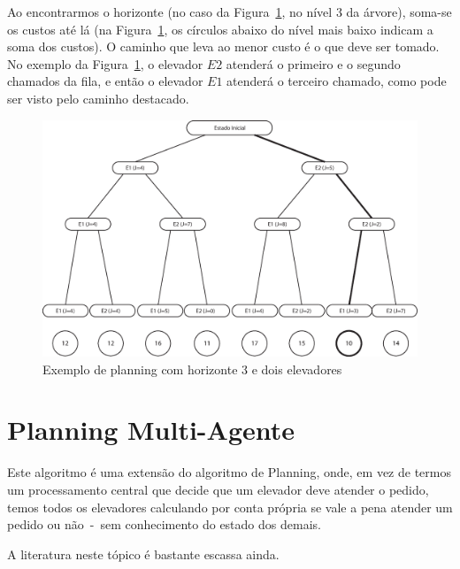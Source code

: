 Ao encontrarmos o horizonte (no caso da Figura~\ref{fig:planning}, no nível 3 da
árvore), soma-se os custos até lá (na Figura~\ref{fig:planning}, os círculos
abaixo do nível mais baixo indicam a soma dos custos). O caminho que leva ao
menor custo é o que deve ser tomado. No exemplo da Figura~\ref{fig:planning}, o
elevador $E2$ atenderá o primeiro e o segundo chamados da fila, e então o
elevador $E1$ atenderá o terceiro chamado, como pode ser visto pelo caminho destacado.

\begin{figure}[htb!]
  \centering
  \includegraphics[scale=0.6]{img/planning.eps}
  \caption{Exemplo de planning com horizonte 3 e dois elevadores}
\label{fig:planning}
\end{figure}

\section{Planning Multi-Agente}

Este algoritmo é uma extensão do algoritmo de Planning, onde, em vez de termos
um processamento central que decide que um elevador deve atender o pedido, temos
todos os elevadores calculando por conta própria se vale a pena atender um
pedido ou não~-~sem conhecimento do estado dos demais.

A literatura neste tópico é bastante escassa ainda.